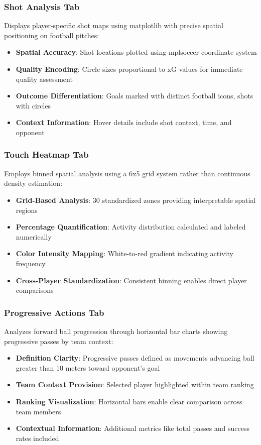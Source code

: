 \documentclass[12pt,a4paper]{article}
\begin{document}
\subsubsection{Shot Analysis Tab}
Displays player-specific shot maps using matplotlib with precise spatial positioning on football pitches:
\begin{itemize}
    \item \textbf{Spatial Accuracy}: Shot locations plotted using mplsoccer coordinate system
    \item \textbf{Quality Encoding}: Circle sizes proportional to xG values for immediate quality assessment
    \item \textbf{Outcome Differentiation}: Goals marked with distinct football icons, shots with circles
    \item \textbf{Context Information}: Hover details include shot context, time, and opponent
\end{itemize}



\subsubsection{Touch Heatmap Tab}
Employs binned spatial analysis using a 6x5 grid system rather than continuous density estimation:
\begin{itemize}
    \item \textbf{Grid-Based Analysis}: 30 standardized zones providing interpretable spatial regions
    \item \textbf{Percentage Quantification}: Activity distribution calculated and labeled numerically
    \item \textbf{Color Intensity Mapping}: White-to-red gradient indicating activity frequency
    \item \textbf{Cross-Player Standardization}: Consistent binning enables direct player comparisons
\end{itemize}


\subsubsection{Progressive Actions Tab}
Analyzes forward ball progression through horizontal bar charts showing progressive passes by team context:
\begin{itemize}
    \item \textbf{Definition Clarity}: Progressive passes defined as movements advancing ball greater than 10 meters toward opponent's goal
    \item \textbf{Team Context Provision}: Selected player highlighted within team ranking
    \item \textbf{Ranking Visualization}: Horizontal bars enable clear comparison across team members
    \item \textbf{Contextual Information}: Additional metrics like total passes and success rates included
\end{itemize}
\end{document}
